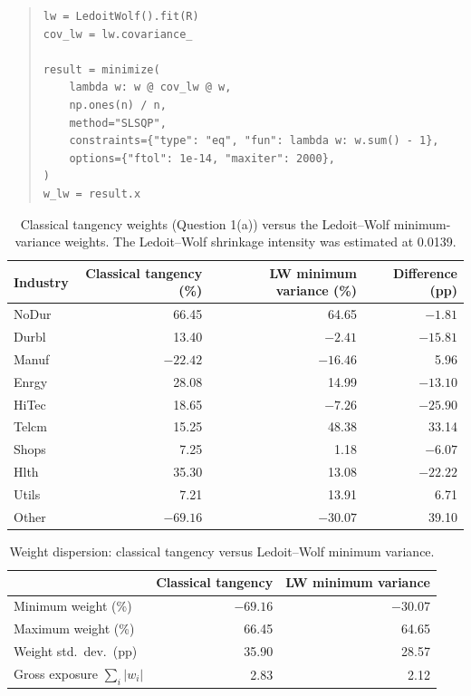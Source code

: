 \documentclass[11pt]{article}
\begin{document}
\begin{quote}
\small
\begin{verbatim}
lw = LedoitWolf().fit(R)
cov_lw = lw.covariance_

result = minimize(
    lambda w: w @ cov_lw @ w,
    np.ones(n) / n,
    method="SLSQP",
    constraints={"type": "eq", "fun": lambda w: w.sum() - 1},
    options={"ftol": 1e-14, "maxiter": 2000},
)
w_lw = result.x
\end{verbatim}
\end{quote}

\begin{table}[H]
\centering
\caption{Classical tangency weights (Question 1(a)) versus the Ledoit--Wolf
minimum-variance weights. The Ledoit--Wolf shrinkage intensity was estimated
at 0.0139.}
\small
\begin{tabular}{lrrr}
\toprule
Industry & Classical tangency (\%) & LW minimum variance (\%) & Difference
(pp) \\
\midrule
NoDur & 66.45 & 64.65 & $-1.81$ \\
Durbl & 13.40 & $-2.41$ & $-15.81$ \\
Manuf & $-22.42$ & $-16.46$ & 5.96 \\
Enrgy & 28.08 & 14.99 & $-13.10$ \\
HiTec & 18.65 & $-7.26$ & $-25.90$ \\
Telcm & 15.25 & 48.38 & 33.14 \\
Shops & 7.25 & 1.18 & $-6.07$ \\
Hlth & 35.30 & 13.08 & $-22.22$ \\
Utils & 7.21 & 13.91 & 6.71 \\
Other & $-69.16$ & $-30.07$ & 39.10 \\
\bottomrule
\end{tabular}
\label{tab:q3weights}
\end{table}

\begin{table}[H]
\centering
\caption{Weight dispersion: classical tangency versus Ledoit--Wolf minimum
variance.}
\small
\begin{tabular}{lrr}
\toprule
 & Classical tangency & LW minimum variance \\
\midrule
Minimum weight (\%) & $-69.16$ & $-30.07$ \\
Maximum weight (\%) & 66.45 & 64.65 \\
Weight std.\ dev.\ (pp) & 35.90 & 28.57 \\
Gross exposure $\sum_i|w_i|$ & 2.83 & 2.12 \\
\bottomrule
\end{tabular}
\label{tab:q3dispersion}
\end{table}
\end{document}
